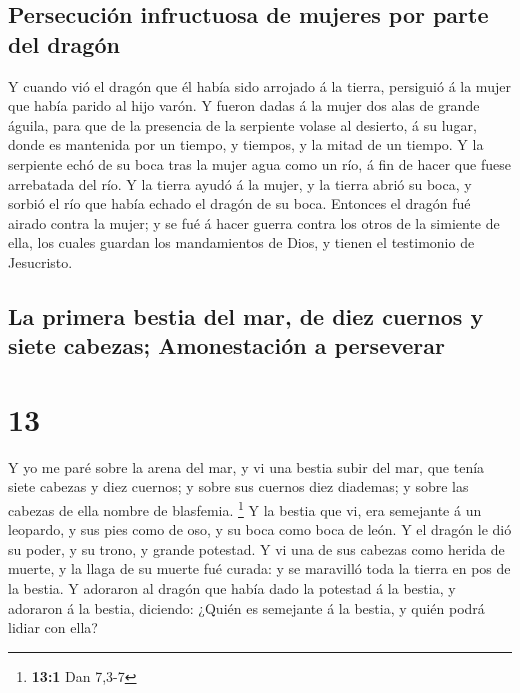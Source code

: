 \hypertarget{persecuciuxf3n-infructuosa-de-mujeres-por-parte-del-draguxf3n}{%
\subsection{Persecución infructuosa de mujeres por parte del
dragón}\label{persecuciuxf3n-infructuosa-de-mujeres-por-parte-del-draguxf3n}}

 Y cuando vió el dragón que él había sido arrojado á la
tierra, persiguió á la mujer que había parido al hijo varón.
 Y fueron dadas á la mujer dos alas de grande águila, para
que de la presencia de la serpiente volase al desierto, á su lugar,
donde es mantenida por un tiempo, y tiempos, y la mitad de un tiempo.
 Y la serpiente echó de su boca tras la mujer agua como un
río, á fin de hacer que fuese arrebatada del río.  Y la
tierra ayudó á la mujer, y la tierra abrió su boca, y sorbió el río que
había echado el dragón de su boca.  Entonces el dragón fué
airado contra la mujer; y se fué á hacer guerra contra los otros de la
simiente de ella, los cuales guardan los mandamientos de Dios, y tienen
el testimonio de Jesucristo.

\hypertarget{la-primera-bestia-del-mar-de-diez-cuernos-y-siete-cabezas-amonestaciuxf3n-a-perseverar}{%
\subsection{La primera bestia del mar, de diez cuernos y siete cabezas;
Amonestación a
perseverar}\label{la-primera-bestia-del-mar-de-diez-cuernos-y-siete-cabezas-amonestaciuxf3n-a-perseverar}}

\hypertarget{section-12}{%
\section{13}\label{section-12}}

 Y yo me paré sobre la arena del mar, y vi una bestia subir
del mar, que tenía siete cabezas y diez cuernos; y sobre sus cuernos
diez diademas; y sobre las cabezas de ella nombre de blasfemia.
\footnote{\textbf{13:1} Dan 7,3-7}  Y la bestia que vi, era
semejante á un leopardo, y sus pies como de oso, y su boca como boca de
león. Y el dragón le dió su poder, y su trono, y grande potestad.
 Y vi una de sus cabezas como herida de muerte, y la llaga
de su muerte fué curada: y se maravilló toda la tierra en pos de la
bestia.  Y adoraron al dragón que había dado la potestad á
la bestia, y adoraron á la bestia, diciendo: ¿Quién es semejante á la
bestia, y quién podrá lidiar con ella?

